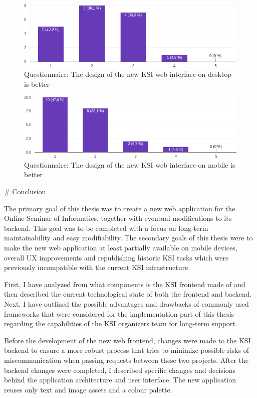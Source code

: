 \documentclass[
  digital, %
  oneside, %
  lof,     %
  nolot,     %
]{fithesis4}
\begin{document}
{\begin{figure}
\includegraphics[width=\textwidth]{assets/img/questionare/pc-ui}
\caption{Questionnaire: The design of the new \acrshort{KSI} web interface on desktop is better}
\label{fig:q-ui-pc}
\end{figure}

\begin{figure}
\includegraphics[width=\textwidth]{assets/img/questionare/mobile-ui}
\caption{Questionnaire: The design of the new \acrshort{KSI} web interface on mobile is better}
\label{fig:q-ui-mobile}
\end{figure}

# Conclusion

The primary goal of this thesis was to create a new web application for the Online Seminar of Informatics, together with eventual modifications to its backend. This goal was to be completed with a focus on long-term maintainability and easy modifiability. The secondary goals of this thesis were to make the new web application at least partially available on mobile devices, overall \acrshort{UX} improvements and republishing historic \acrshort{KSI} tasks which were previously incompatible with the current \acrshort{KSI} infrastructure.

First, I have analyzed from what components is the \acrshort{KSI} frontend made of and then described the current technological state of both the frontend and backend. Next, I have outlined the possible advantages and drawbacks of commonly used frameworks that were considered for the implementation part of this thesis regarding the capabilities of the \acrshort{KSI} organizers team for long-term support.

Before the development of the new web frontend, changes were made to the \acrshort{KSI} backend to ensure a more robust process that tries to minimize possible risks of miscommunication when passing requests between these two projects. After the backend changes were completed, I described specific changes and decisions behind the application architecture and user interface. The new application reuses only text and image assets and a colour palette.

}
\end{document}
